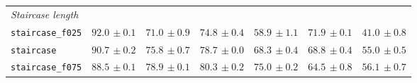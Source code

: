 \begin{tabular}{lcccccc}
\multicolumn{7}{l}{\textit{Staircase length}} \\
\texttt{staircase\_f025} & $92.0{\scriptstyle\,\pm0.1}$ & $71.0{\scriptstyle\,\pm0.9}$ & $74.8{\scriptstyle\,\pm0.4}$ & $58.9{\scriptstyle\,\pm1.1}$ & $71.9{\scriptstyle\,\pm0.1}$ & $41.0{\scriptstyle\,\pm0.8}$ \\
\texttt{staircase} & $90.7{\scriptstyle\,\pm0.2}$ & $75.8{\scriptstyle\,\pm0.7}$ & $78.7{\scriptstyle\,\pm0.0}$ & $68.3{\scriptstyle\,\pm0.4}$ & $68.8{\scriptstyle\,\pm0.4}$ & $55.0{\scriptstyle\,\pm0.5}$ \\
\texttt{staircase\_f075} & $88.5{\scriptstyle\,\pm0.1}$ & $78.9{\scriptstyle\,\pm0.1}$ & $80.3{\scriptstyle\,\pm0.2}$ & $75.0{\scriptstyle\,\pm0.2}$ & $64.5{\scriptstyle\,\pm0.8}$ & $56.1{\scriptstyle\,\pm0.7}$ \\
\hline
\end{tabular}
